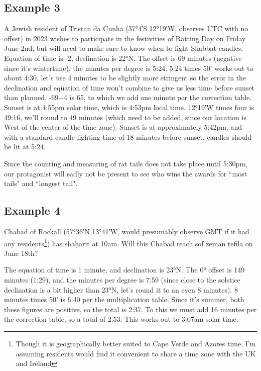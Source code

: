 \subsection{Example 3}

A Jewish resident of Tristan da Cunha (37°4′S 12°19′W, observes UTC with no offset) in 2023 wishes to participate in the festivities of Ratting Day on Friday June 2nd, but will need to make sure to know when to light Shabbat candles. Equation of time is -2, declination is 22°N. The offset is 69 minutes (negative since it's wintertime), the minutes per degree is 5:24.  5:24 times 50' works out to about 4:30, let's use 4 minutes to be slightly more stringent so the error in the declination and equation of time won't combine to give us less time before sunset than planned.  -69+4 is 65, to which we add one minute per the correction table.  Sunset is at 4:55pm solar time, which is 4:53pm local time. 12°19′W times four is 49:16, we'll round to 49 minutes (which need to be added, since our location is West of the center of the time zone).  Sunset is at approximately 5:42pm, and with a standard candle lighting time of 18 minutes before sunset, candles should be lit at 5:24.

Since the counting and measuring of rat tails does not take place until 5:30pm, our protagonist will sadly not be present to see who wins the awards for ``most tails" and ``longest tail".

\subsection{Example 4}

Chabad of Rockall (57°36′N 13°41′W, would presumably observe GMT if it had any residents\footnote{Though it is geographically better suited to Cape Verde and Azores time, I'm assuming residents would find it convenient to share a time zone with the UK and Ireland}) has sha\d{h}arit at 10am.  Will this Chabad reach sof zeman tefila on June 18th?

The equation of time is 1 minute, and declination is 23°N.  The 0° offset is 149 minutes (1:29), and the minutes per degree is 7:59 (since close to the solstice declination is a bit higher than 23°N, let's round it to an even 8 minutes).  8 minutes times 50' is 6:40 per the multiplication table.  Since it's summer, both these figures are positive, so the total is 2:37.  To this we must add 16 minutes per the correction table, so a total of 2:53.  This works out to 3:07am solar time.

